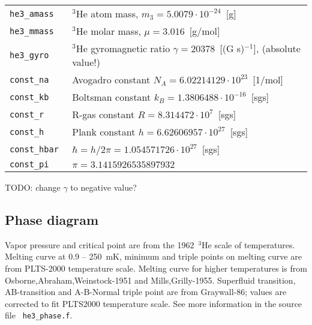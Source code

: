 \documentclass[a4paper]{article}
\begin{document}
\medskip
\noindent\begin{tabular}{lp{12.5cm}}
\tt he3\_amass     & $^3$He atom mass, $m_3 = 5.0079 \cdot 10^{-24}$~[g]\\
\tt he3\_mmass     & $^3$He molar mass, $\mu = 3.016$~[g/mol]\\
\tt he3\_gyro      & $^3$He gyromagnetic ratio $\gamma = 20378$~[(G s)$^{-1}$],\newline
                     (absolute value!)\\
\tt const\_na      & Avogadro constant $N_A = 6.02214129 \cdot 10^{23}$~[1/mol]\\
\tt const\_kb      & Boltsman constant $k_B = 1.3806488 \cdot 10^{-16}$~[sgs]\\
\tt const\_r       & R-gas constant $R = 8.314472 \cdot 10^{7}$~[sgs]\\
\tt const\_h       & Plank constant $h = 6.62606957 \cdot 10^{27}$~[sgs]\\
\tt const\_hbar    & $\hbar = h/2\pi = 1.054571726 \cdot 10^{27}$~[sgs]\\
\tt const\_pi      & $\pi = 3.1415926535897932$\\
\end{tabular}
\medskip

\noindent TODO: change $\gamma$ to negative value?

\eject
\subsection*{Phase diagram}

Vapor pressure and critical point are from the {1962~$^3$He scale of
temperatures}. Melting curve at 0.9 -- 250~mK, minimum and triple points
on melting curve are from {PLTS-2000 temperature scale}. Melting curve
for higher temperatures is from {Osborne,Abraham,Weinstock-1951} and
{Mills,Grilly-1955}. Superfluid transition, AB-transition and A-B-Normal
triple point are from {Graywall-86}; values are corrected to fit
PLTS2000 temperature scale. See more information in the source file {\tt
he3\_phase.f}.
\end{document}
